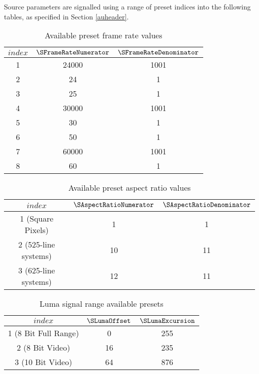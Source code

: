\label{sourceparamspresets}

Source parameters are signalled using a range of preset indices into the following
tables, as specified in Section \ref{auheader}. 

\begin{table}[!ht]
\centering
\begin{tabular}{|c|c|c|}
\hline
$index$ & $\SFrameRateNumerator$ & $\SFrameRateDenominator$ \\
\hline
1 & 24000 & 1001 \\
\hline
2 & 24 & 1 \\
\hline
3 & 25 & 1 \\
\hline
4 & 30000 & 1001 \\
\hline
5 & 30 & 1 \\
\hline
6 & 50 & 1 \\
\hline
7 & 60000 & 1001 \\
\hline
8 & 60 & 1 \\
\hline
\end{tabular}
\caption{Available preset frame rate values}\label{frameratevalues}
\end{table}

\begin{table}[!ht]
\centering
\begin{tabular}{|c|c|c|}
\hline
$index$ & $\SAspectRatioNumerator$ & $\SAspectRatioDenominator$ \\
\hline
1 (Square Pixels) & 1 & 1 \\
\hline
2 (525-line systems) & 10 & 11 \\
\hline
3 (625-line systems) & 12 & 11 \\
\hline
\end{tabular}
\caption{Available preset aspect ratio values}\label{aspectratiovalues}
\end{table}

\begin{table}[!ht]
\centering
\begin{tabular}{|c|c|c|}
\hline
$index$ & $\SLumaOffset$ & $\SLumaExcursion$ \\
\hline
1 (8 Bit Full Range) & 0 & 255 \\
\hline
2 (8 Bit Video) & 16 & 235 \\
\hline
3 (10 Bit Video) & 64 & 876 \\
\hline
\end{tabular}
\caption{Luma signal range available presets}\label{lumasignalrangevalues}
\end{table}

